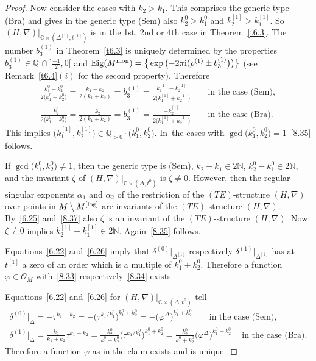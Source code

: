 \documentclass[pdftex]{sigma}%
\numberwithin{equation}{section}
\numberwithin{figure}{section}
\newcommand{\N}{{\mathbb N}}
\newcommand{\Q}{{\mathbb Q}}
\newcommand{\C}{{\mathbb C}}
\newcommand{\OO}{{\mathcal O}}
\newcommand{\nnn}{\nabla}
\DeclareMathOperator{\Eig}{Eig}
\begin{document}
\begin{proof}
Now consider the cases with $k_2>k_1$.
This comprises the generic type (Bra) and
gives in the generic type (Sem) also $k_2^0>k_1^0$
and $k_2^{[1]}>k_1^{[1]}$.
So $(H,\nnn)|_{\C\times(\Delta^{[1]},t^{[1]})}$ is
in the 1st, 2nd or 4th case in Theorem~\ref{t6.3}.
The number $b_3^{(1)}$ in Theorem~\ref{t6.3} is uniquely
determined by the properties
$b_3^{(1)}\in\Q\,\cap \big]\frac{-1}{2},0\big[$ and
$\Eig(M^{\rm mon})=\big\{\exp\big({-}2\pi {\rm i} (\rho^{(1)}\pm b_3^{(1)}\big)\big)\big\}$
(see Remark~\ref{t6.4}$(i)$ for the second property).
Therefore
\begin{gather}
\frac{k_1^0-k_2^0}{2\big(k_1^0+k_2^0\big)}
=\frac{k_1-k_2}{2(k_1+k_2)} =b_3^{(1)}
=\frac{k_1^{[1]}-k_2^{[1]}}{2\big(k_1^{[1]}+k_2^{[1]}\big)}\qquad
\text{in the case (Sem)},\nonumber
\\
\frac{-k_2^0}{2\big(k_1^0+k_2^0\big)}
=\frac{-k_2}{2(k_1+k_2)} =b_3^{(1)}
=\frac{-k_2^{[1]}}{2\big(k_1^{[1]}+k_2^{[1]}\big)}\qquad
\text{in the case (Bra)}.\label{8.37}
\end{gather}
This implies $\big(k_1^{[1]},k_2^{[1]}\big)\in
\Q_{>0}\cdot\big(k_1^0,k_2^0\big)$. In~the cases with $\gcd\big(k_1^0,k_2^0\big)=1$~\eqref{8.35} follows.

If $\gcd\big(k_1^0,k_2^0\big)\neq 1$, then the generic type
is (Sem), $k_2-k_1\in 2\N$, $k_2^0-k_1^0\in 2\N$,
and the invariant $\zeta$ of
$(H,\nnn)|_{\C\times(\Delta,t^0)}$ is $\zeta\neq 0$.
However, then the regular singular
exponents $\alpha_1$ and $\alpha_2$ of the restriction
of the $(TE)$-structure $(H,\nnn)$ over points in
$M\setminus M^{\rm [log]}$ are invariants of the $(TE)$-structure
$(H,\nnn)$. By~\eqref{6.25} and~\eqref{8.37}
also $\zeta$ is an invariant of the $(TE)$-structure
$(H,\nnn)$. Now $\zeta\neq 0$ implies
$k_2^{[1]}-k_1^{[1]}\in 2\N$. Again~\eqref{8.35} follows.

Equations~\eqref{6.22} and~\eqref{6.26} imply that
$\delta^{(0)}|_{\Delta^{[1]}}$
respectively $\delta^{(1)}|_{\Delta^{[1]}}$
has at $t^{[1]}$ a zero of an order which is a multiple of
$k_1^0+k_2^0$. Therefore a function $\varphi\in\OO_M$
with~\eqref{8.33} respectively~\eqref{8.34} exists.

Equations~\eqref{6.22} and~\eqref{6.26} for $(H,\nnn)|_{\C\times(\Delta,t^0)}$
tell
\begin{gather*}
\delta^{(0)}|_\Delta = -\tau^{k_1+k_2}
=-\big(\tau^{k_1/k_1^0}\big)^{k_1^0+k_2^0}
=-\big(\varphi^\Delta\big)^{k_1^0+k_2^0}\qquad
\text{in the case (Sem),}
\\
\delta^{(1)}|_\Delta = \frac{k_2}{k_1+k_2}\tau^{k_1+k_2}
=\frac{k_2^0}{k_1^0+k_2^0}\big(\tau^{k_1/k_1^0}\big)^{k_1^0+k_2^0}
=\frac{k_2^0}{k_1^0+k_2^0}\big(\varphi^\Delta\big)^{k_1^0+k_2^0}\quad\
\text{in the case (Bra).}
\end{gather*}
Therefore a function $\varphi$ as in the claim exists
and is unique.
\end{proof}
\end{document}
